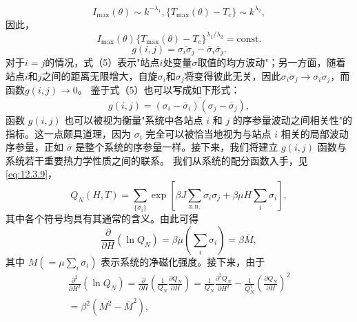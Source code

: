 \begin{equation}\tag{12.11.3}\label{eq:12.11.3}
I _ { \mathrm { m a x } } ( \theta ) \sim k ^{- \lambda _ { 1} } ,  \{ T _ { \mathrm { m a x } } ( \theta ) - T _ { c } \} \sim k ^{\lambda _ { 2} } ,
\end{equation}
因此，
\begin{equation}\tag{12.11.4}\label{eq:12.11.4}
I _ { \mathrm { m a x } } ( \theta ) \{ T _ { \mathrm { m a x } } ( \theta ) - T _ { c } \} ^{\lambda _ { 1} / \lambda _ { 2 } } = \mathrm { c o n s t . }
\end{equation}
\begin{equation}\tag{12.11.5}\label{eq:12.11.5}
g ( i , j ) = \overline { { \sigma _ { i } \sigma _ { j } } } - \overline { { \sigma } } _ { i } \overline { { \sigma } } _ { j } .
\end{equation}
对于\(i=j\)的情况，式（5）表示"站点\(i\)处变量\(\sigma\)取值的均方波动"；另一方面，随着站点\(i\)和\(j\)之间的距离无限增大，自旋\(\sigma_i\)和\(\sigma_j\)将变得彼此无关，因此\(\overline{\sigma_i\sigma_j} \to \overline{\sigma_i\sigma_j}\)，而函数\(g(i,j) \to 0\)。
鉴于式（5）也可以写成如下形式：
\begin{equation}\tag{12.11.6}\label{eq:12.11.6}
g ( i , j ) = \overline { { ( \sigma _ { i } - \overline { { \sigma } } _ { i } ) ( \sigma _ { j } - \overline { { \sigma } } _ { j } ) } } ,
\end{equation}
函数 \(g(i,j)\) 也可以被视为衡量"系统中各站点 \(i\) 和 \(j\) 的序参量波动之间相关性"的指标。这一点颇具道理，因为 \(\sigma_i\) 完全可以被恰当地视为与站点 \(i\) 相关的局部波动序参量，正如 \(\overline{\sigma}\) 是整个系统的序参量一样。接下来，我们将建立 \(g(i,j)\) 函数与系统若干重要热力学性质之间的联系。
我们从系统的配分函数入手，见 \autoref{eq:12.3.9}，
\begin{equation}\tag{12.11.7}\label{eq:12.11.7}
Q _ { N } ( H , T ) = \sum _ { \{ \sigma _ { i } \} } \exp \left[ \beta J \sum _ { \mathrm { n . n . } } \sigma _ { i } \sigma _ { j } + \beta \mu H \sum _ { i } \sigma _ { i } \right] ,
\end{equation}
其中各个符号均具有其通常的含义。由此可得
\begin{equation}\tag{12.11.8}\label{eq:12.11.8}
\frac { \partial } { \partial H } ( \ln Q _ { N } ) = \beta \mu \left( \sum _ { i } \sigma _ { i } \right) = \beta \overline { { { M } } } ,
\end{equation}
其中 \(M(= \mu \sum_{i} \sigma_{i})\) 表示系统的净磁化强度。接下来，由于
\begin{equation}\tag{12.11.9}\label{eq:12.11.9}
\begin{array}{r} { \frac { \partial ^{2} } { \partial H ^{2} } ( \ln Q _ { N } ) = \frac { \partial } { \partial H } \left( \frac { 1 } { Q _ { N } } \frac { \partial Q _ { N } } { \partial H } \right) = \frac { 1 } { Q _ { N } } \frac { \partial ^{2} Q _ { N } } { \partial H ^{2} } - \frac { 1 } { Q _ { N } ^{2} } \left( \frac { \partial Q _ { N } } { \partial H } \right) ^{2} } \\{ = \beta ^{2} ( \overline { { M ^{2} } } - \overline { { M } } ^{2} ) , } \end{array}
\end{equation}
